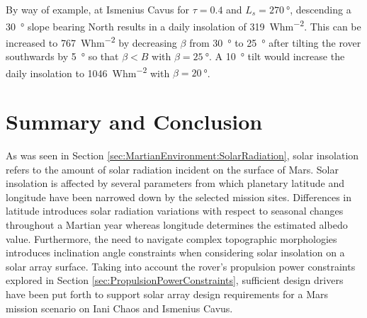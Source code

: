 By way of example, at Ismenius Cavus for $\tau = 0.4$ and $L_{s}=\SI{270}{\degree}$, descending a \SI{30}{\degree} slope bearing North results in a daily insolation of \SI{319}{Whm^{-2}}. This can be increased to \SI{767}{Whm^{-2}} by decreasing $\beta$ from \SI{30}{\degree} to \SI{25}{\degree} after tilting the rover southwards by \SI{5}{\degree} so that $\beta < B$ with $\beta = \SI{25}{\degree}$. A \SI{10}{\degree} tilt would increase the daily insolation to \SI{1046}{Whm^{-2}} with $\beta = \SI{20}{\degree}$.


\section{Summary and Conclusion}
As was seen in Section \ref{sec:MartianEnvironment:SolarRadiation}, solar insolation refers to the amount of solar radiation incident on the surface of Mars. Solar insolation is affected by several parameters from which planetary latitude and longitude have been narrowed down by the selected mission sites. Differences in latitude introduces solar radiation variations with respect to seasonal changes throughout a Martian year whereas longitude determines the estimated albedo value. Furthermore, the need to navigate complex topographic morphologies introduces inclination angle constraints when considering solar insolation on a solar array surface. Taking into account the rover's propulsion power constraints explored in Section \ref{sec:PropulsionPowerConstraints}, sufficient design drivers have been put forth to support solar array design requirements for a Mars mission scenario on Iani Chaos and Ismenius Cavus.
